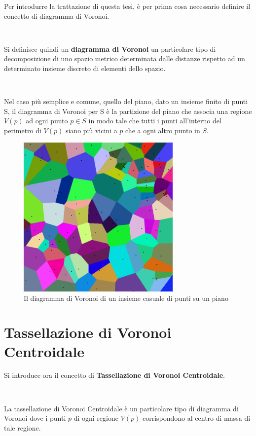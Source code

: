 \documentclass[11pt,a4paper]{report}
\begin{document}
Per introdurre la trattazione di questa tesi, è per prima cosa necessario definire il concetto di diagramma di Voronoi.

\

Si definisce quindi un \textbf{diagramma di Voronoi} un particolare tipo di decomposizione di uno spazio metrico determinata dalle distanze rispetto ad un determinato insieme discreto di elementi dello spazio.

\

Nel caso più semplice e comune, quello del piano, dato un insieme finito di punti S, il diagramma di Voronoi per S è la partizione del piano che associa una regione $V(p)$ ad ogni punto $p \in S$ in modo tale che tutti i punti all'interno del perimetro di $V(p)$ siano più vicini a $p$ che a ogni altro punto in $S$.

\begin{figure}[H]
	\centering
	\includegraphics[width=8cm]{Coloured_Voronoi_2D.png}
	\caption{Il diagramma di Voronoi di un insieme casuale di punti su un piano}
\end{figure}

\section{Tassellazione di Voronoi Centroidale}

Si introduce ora il concetto di \textbf{Tassellazione di Voronoi Centroidale}.

\

La tassellazione di Voronoi Centroidale è un particolare tipo di diagramma di Voronoi dove i punti $p$ di ogni regione $V(p)$ corrispondono al centro di massa di tale regione.
\end{document}
